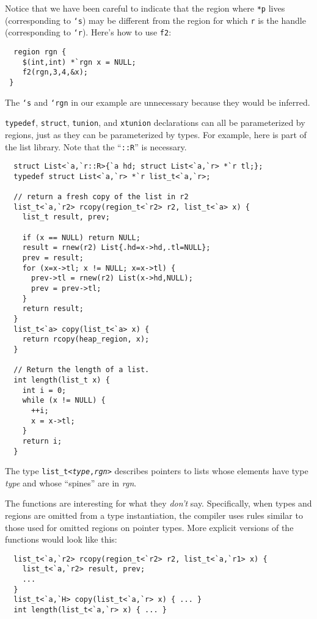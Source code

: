 Notice that we have been careful to indicate that the region where
\texttt{*p} lives (corresponding to \texttt{`s}) may be different from
the region for which \texttt{r} is the handle (corresponding to
\texttt{`r}).  Here's how to use \texttt{f2}:
\begin{verbatim}
  region rgn { 
    $(int,int) *`rgn x = NULL; 
    f2(rgn,3,4,&x);
 }
\end{verbatim} %
The \texttt{`s} and \texttt{`rgn} in our example are unnecessary
because they would be inferred.

\texttt{typedef}, \texttt{struct}, \texttt{tunion}, and
\texttt{xtunion} declarations can all be parameterized by regions,
just as they can be parameterized by types.  For example, here is part
of the list library.  Note that the ``\texttt{::R}'' is necessary.
\begin{verbatim}
  struct List<`a,`r::R>{`a hd; struct List<`a,`r> *`r tl;};
  typedef struct List<`a,`r> *`r list_t<`a,`r>;

  // return a fresh copy of the list in r2
  list_t<`a,`r2> rcopy(region_t<`r2> r2, list_t<`a> x) {
    list_t result, prev;

    if (x == NULL) return NULL;
    result = rnew(r2) List{.hd=x->hd,.tl=NULL};
    prev = result;
    for (x=x->tl; x != NULL; x=x->tl) {
      prev->tl = rnew(r2) List(x->hd,NULL);
      prev = prev->tl;
    }
    return result;
  }  
  list_t<`a> copy(list_t<`a> x) {
    return rcopy(heap_region, x);
  }

  // Return the length of a list. 
  int length(list_t x) {
    int i = 0;
    while (x != NULL) {
      ++i;
      x = x->tl;
    }
    return i;
  }
\end{verbatim}
The type \texttt{list_t<\textit{type},\textit{rgn}>} describes
pointers to lists whose elements have type \textit{type} and whose
``spines'' are in \textit{rgn}.  

The functions are interesting for what they \emph{don't} say.
Specifically, when types and regions are omitted from a type
instantiation, the compiler uses rules similar to those used for
omitted regions on pointer types.  More explicit versions of the
functions would look like this:
\begin{verbatim}
  list_t<`a,`r2> rcopy(region_t<`r2> r2, list_t<`a,`r1> x) {
    list_t<`a,`r2> result, prev;
    ...
  }
  list_t<`a,`H> copy(list_t<`a,`r> x) { ... }
  int length(list_t<`a,`r> x) { ... }
\end{verbatim}

